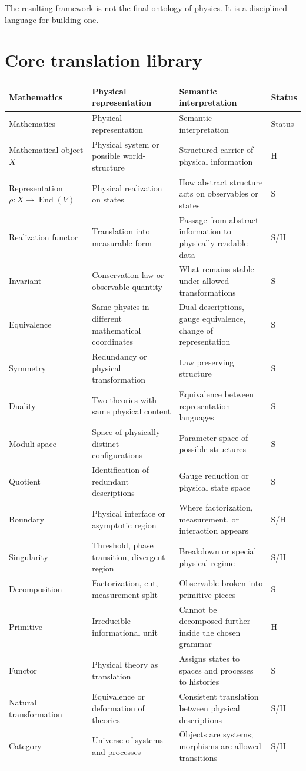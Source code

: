 \documentclass[11pt]{article}
\newcommand{\End}{\operatorname{End}}
\newcommand{\status}[1]{\textsf{#1}}
\newcommand{\entry}[4]{#1 & #2 & #3 & \status{#4}\\}
\begin{document}
The resulting framework is not the final ontology of physics. It is a disciplined language for building one.

\appendix
\section{Core translation library}
\footnotesize
{}
\begin{longtable}{@{}>{\raggedright\arraybackslash}p{}>{\raggedright\arraybackslash}p{}>{\raggedright\arraybackslash}p{}>{\centering\arraybackslash}p{}@{}}
\toprule
Mathematics & Physical representation & Semantic interpretation & Status\\
\midrule
\endfirsthead
\toprule
Mathematics & Physical representation & Semantic interpretation & Status\\
\midrule
\endhead
\bottomrule
\endfoot
\entry{Mathematical object $X$}{Physical system or possible world-structure}{Structured carrier of physical information}{H}
\entry{Representation $\rho:X\to \End(V)$}{Physical realization on states}{How abstract structure acts on observables or states}{S}
\entry{Realization functor}{Translation into measurable form}{Passage from abstract information to physically readable data}{S/H}
\entry{Invariant}{Conservation law or observable quantity}{What remains stable under allowed transformations}{S}
\entry{Equivalence}{Same physics in different mathematical coordinates}{Dual descriptions, gauge equivalence, change of representation}{S}
\entry{Symmetry}{Redundancy or physical transformation}{Law preserving structure}{S}
\entry{Duality}{Two theories with same physical content}{Equivalence between representation languages}{S}
\entry{Moduli space}{Space of physically distinct configurations}{Parameter space of possible structures}{S}
\entry{Quotient}{Identification of redundant descriptions}{Gauge reduction or physical state space}{S}
\entry{Boundary}{Physical interface or asymptotic region}{Where factorization, measurement, or interaction appears}{S/H}
\entry{Singularity}{Threshold, phase transition, divergent region}{Breakdown or special physical regime}{S/H}
\entry{Decomposition}{Factorization, cut, measurement split}{Observable broken into primitive pieces}{S}
\entry{Primitive}{Irreducible informational unit}{Cannot be decomposed further inside the chosen grammar}{H}
\entry{Functor}{Physical theory as translation}{Assigns states to spaces and processes to histories}{S}
\entry{Natural transformation}{Equivalence or deformation of theories}{Consistent translation between physical descriptions}{S/H}
\entry{Category}{Universe of systems and processes}{Objects are systems; morphisms are allowed transitions}{S/H}
\end{longtable}
\end{document}
